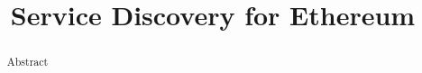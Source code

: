\documentclass[sigconf]{acmart}
\begin{document}
\title{Service Discovery for Ethereum}
\author{}


\begin{abstract}
Abstract
\end{abstract}

\maketitle



















\clearpage


\end{document}
